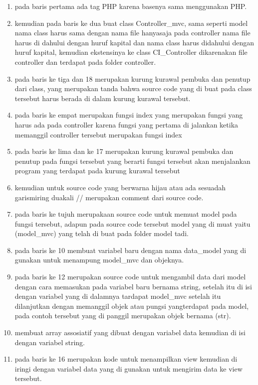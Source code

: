 \begin{enumerate}
\item pada baris pertama ada tag PHP karena basenya sama menggunakan PHP.
\item kemudian pada baris ke dua buat class Controller\_mvc, sama seperti model nama class harus sama dengan nama file hanyasaja pada controller nama file harus di dahului dengan huruf kapital dan nama class harus didahului dengan huruf kapital, kemudian ekstensinya ke class CI\_Controller dikarenakan file controller dan terdapat pada folder controller.
\item pada baris ke tiga dan 18 merupakan kurung kurawal pembuka dan penutup dari class, yang merupakan tanda bahwa source code yang di buat pada class tersebut harus berada di dalam kurung kurawal tersebut.
\item pada baris ke empat merupakan fungsi index yang merupakan fungsi yang harus ada pada controller karena fungsi yang pertama di jalankan ketika memanggil controller tersebut merupakan fungsi index 
\item pada baris ke lima dan ke 17 merupakan kurung kurawal pembuka dan penutup pada fungsi tersebut yang berarti fungsi tersebut akan menjalankan program yang terdapat pada kurung kurawal tersebut 
\item kemudian untuk source code yang berwarna hijau atau ada sesuadah garismiring duakali // merupakan comment dari source code.
\item pada baris ke tujuh merupakaan source code untuk memuat model pada fungsi tersebut, adapun pada source code tersebut model yang di muat yaitu (model\_mvc) yang telah di buat pada folder model tadi.
\item pada baris ke 10 membuat variabel baru dengan nama data\_model yang di gunakan untuk menampung model\_mvc dan objeknya. 
\item pada baris ke 12 merupakan source code untuk mengambil data dari model dengan cara memasukan pada variabel baru bernama string, setelah itu di isi dengan variabel yang di dalamnya tardapat model\_mvc setelah itu dilanjutkan dengan memanggil objek atau pungsi yangterdapat pada model, pada contoh tersebut yang di panggil merupakan objek bernama (str).
\item membuat array assosiatif yang dibuat dengan variabel data kemudian di isi dengan variabel string.
\item pada baris ke 16 merupakan kode untuk menampilkan view kemudian di iringi dengan variabel data yang di gunakan untuk mengirim data ke view tersebut.
\end{enumerate}
\pagebreak

